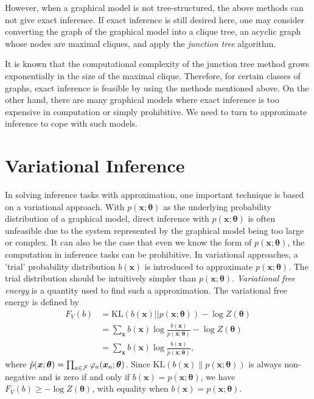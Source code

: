 However, when a graphical model is not tree-structured, the above methods can not give exact inference. If exact inference is still desired here, one may consider converting the graph of the graphical model into a clique tree, an acyclic graph whose nodes are maximal cliques, and apply the \textit{junction tree} algorithm.

It is known that the computational complexity of the junction tree method grows exponentially in the size of the maximal clique. Therefore, for certain classes of graphs, exact inference is feasible by using the methods mentioned above. On the other hand, there are many graphical models where exact inference is too expensive in computation or simply prohibitive. We need to turn to approximate inference to cope with such models.


\section{Variational Inference}
\label{chpt2:sec:variational-inference}

In solving inference tasks with approximation, one important technique is based on a variational approach. With $p(\bm{x};\bm{\theta})$ as the underlying probability distribution of a graphical model, direct inference with $p(\bm{x}; \bm{\theta})$ is often unfeasible due to the system represented by the graphical model being too large or complex. It can also be the case that even we know the form of $p(\bm{x}; \bm{\theta})$, the computation in inference tasks can be prohibitive. In variational approaches, a 'trial' probability distribution $b(\bm{x})$ is introduced to approximate $p(\bm{x};\bm{\theta})$. The trial distribution should be intuitively simpler than $p(\bm{x}; \bm{\theta})$. \textit{Variational free energy} \cite{opper2001advanced} is a quantity used to find such a approximation. The variational free energy is defined by
\begin{align}\label{chpt2:eq:variational-free-energy}
  F_V(b) & = \mathrm{KL}(b( \bm{x}) || p(\bm{x}; \bm{\theta})) - \log{Z(\bm{\theta})} \nonumber \\
         &= \sum_{\bm{x}}b(\bm{x}) \log{\frac{b(\bm{x})}{{p}(\bm{x}; \bm{\theta})}} - \log{Z(\bm{\theta})} \nonumber \\
         & = \sum_{\bm{x}}b(\bm{x}) \log{\frac{b(\bm{x})}{\tilde{p}(\bm{x}; \bm{\theta})}},
\end{align}
where $\tilde{p}(\bm{x}; \bm{\theta}) =  \prod_{a \in \mathcal{F}} \varphi_{a}(\bm{x}_{a}; \bm{\theta})$. Since $\mathrm{KL}(b(\bm{x})\|p(\bm{x};\bm{\theta}))$ is always non-negative and is zero if and only if $b(\bm{x}) = p(\bm{x};\bm{\theta})$, we have $F_V(b) \geq - \log{Z(\bm{\theta})}$, with equality when $b(\bm{x}) = p(\bm{x};\bm{\theta})$.

